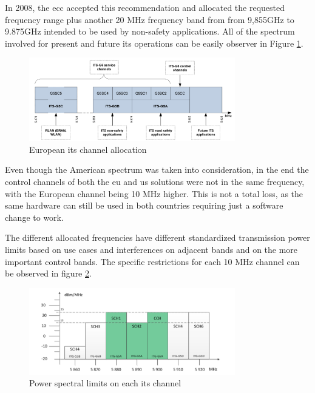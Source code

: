 In 2008, the \gls{ecc} accepted this recommendation and allocated the requested frequency range plus another 20 MHz frequency band from from 9,855GHz to 9.875GHz intended to be used by non-safety applications\cite{harri_multi-channel_2015}\cite{asselin-miller_study_2016}. All of the spectrum involved for present and future \gls{its} operations can be easily observer in Figure \ref{fig:EU_channels}.

\begin{figure}[htbp]
    \centering
    \includegraphics[width=0.8\textwidth]{Chapters/Figures/VANETs/European_its_channels.png}
   	\caption{European \gls{its} channel allocation~\cite{soriga_its-g5_2012}}
   	\label{fig:EU_channels}
\end{figure}

Even though the American spectrum was taken into consideration, in the end the control channels of both the \gls{eu} and \gls{us} solutions were not in the same frequency, with the European channel being 10 MHz higher. This is not a total loss, as the same hardware can still be used in both countries requiring just a software change to work\cite{harri_multi-channel_2015}\cite{asselin-miller_study_2016}.

The different allocated frequencies have different standardized transmission power limits based on use cases and interferences on adjacent bands and on the more important control bands\cite{festag_cooperative_2014}. The specific restrictions for each 10 MHz channel can be observed in figure \ref{fig:EU_channet_restriction}.

\begin{figure}[htbp]
    \centering
    \includegraphics[width=0.8\textwidth]{Chapters/Figures/VANETs/European_its_channels_restrictions.png}
   	\caption{Power spectral limits on each \gls{its} channel~\cite{harri_multi-channel_2015}}
   	\label{fig:EU_channet_restriction}
\end{figure}

